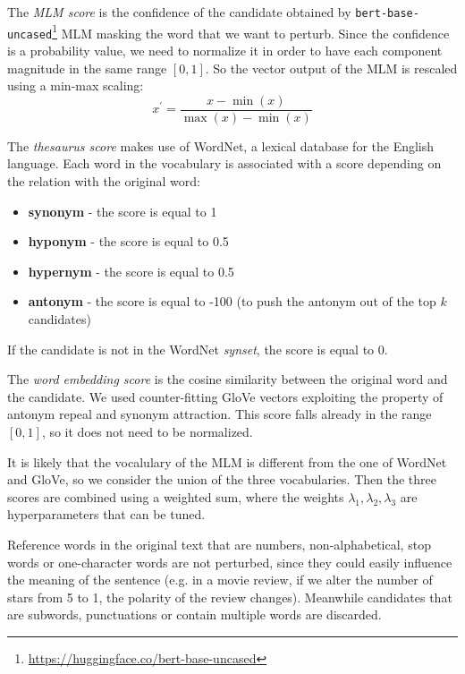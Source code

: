 The \emph{MLM score} is the confidence of the candidate obtained by \texttt{bert-base-uncased}\footnote{\url{https://huggingface.co/bert-base-uncased}} MLM masking the word that we want to perturb.
Since the confidence is a probability value, we need to normalize it in order to have each component magnitude in the same range $[0,1]$.
So the vector output of the MLM is rescaled using a min-max scaling:
\begin{equation}
    x^\prime = \frac{x - \min(x)}{\max(x) - \min(x)}
\end{equation}

The \emph{thesaurus score} makes use of WordNet, a lexical database for the English language. Each word in the vocabulary is associated with a score depending on the relation with the original word:
\begin{itemize}
    \item \textbf{synonym} - the score is equal to 1
    \item \textbf{hyponym} - the score is equal to 0.5
    \item \textbf{hypernym} - the score is equal to 0.5
    \item \textbf{antonym} - the score is equal to -100 (to push the antonym out of the top $k$ candidates)
\end{itemize}
If the candidate is not in the WordNet \emph{synset}, the score is equal to 0.

The \emph{word embedding score} is the cosine similarity between the original word and the candidate. We used counter-fitting GloVe vectors \cite{conf/naacl/MrksicSTGRSVWY16} exploiting the property of antonym repeal and synonym attraction. 
This score falls already in the range $[0,1]$, so it does not need to be normalized.

It is likely that the vocalulary of the MLM is different from the one of WordNet and GloVe, so we consider the union of the three vocabularies.
Then the three scores are combined using a weighted sum, where the weights $\lambda_1, \lambda_2, \lambda_3$ are hyperparameters that can be tuned.

Reference words in the original text that are numbers, non-alphabetical, stop words or one-character words are not perturbed, since they could easily influence the meaning of the sentence (e.g. in a movie review, if we alter the number of stars from 5 to 1, the polarity of the review changes).
Meanwhile candidates that are subwords, punctuations or contain multiple words are discarded.

